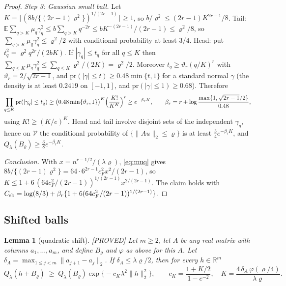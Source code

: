 \documentclass[11pt]{article}
\newtheorem{lemma}{Lemma}
\theoremstyle{definition}
\theoremstyle{remark}
\newcommand{\R}{\mathbb{R}}
\newcommand{\E}{\mathbb{E}}
\newcommand{\pr}{\mathrm{pr}}
\newcommand{\Ql}{Q_\lambda}
\newcommand{\proved}{\textup{[PROVED]}}
\begin{document}
\begin{proof}
\emph{Step 3: Gaussian small ball.} Let $K=\lceil(8b/\{(2r-1)\varrho^2\})^{1/(2r-1)}\rceil\ge1$, so $b/\varrho^2\le(2r-1)K^{2r-1}/8$. Tail: $\E\sum_{q>K}\mu_q\gamma_q^2\le b\sum_{q>K}q^{-2r}\le bK^{-(2r-1)}/(2r-1)\le\varrho^2/8$, so $\sum_{q>K}\mu_q\gamma_q^2\le\varrho^2/2$ with conditional probability at least $3/4$. Head: put $t_q^2=\varrho^2q^{2r}/(2bK)$. If $|\gamma_q|\le t_q$ for all $q\le K$ then $\sum_{q\le K}\mu_q\gamma_q^2\le\sum_{q\le K}\varrho^2/(2K)=\varrho^2/2$. Moreover $t_q\ge\vartheta_r(q/K)^r$ with $\vartheta_r=2/\sqrt{2r-1}$, and $\pr(|\gamma|\le t)\ge0.48\min\{t,1\}$ for a standard normal $\gamma$ (the density is at least $0.2419$ on $[-1,1]$, and $\pr(|\gamma|\le1)\ge0.68$). Therefore
\[
\prod_{q\le K}\pr(|\gamma_q|\le t_q)\ge\bigl(0.48\min\{\vartheta_r,1\}\bigr)^K\Bigl(\frac{K!}{K^K}\Bigr)^r\ge e^{-\beta_rK},\qquad \beta_r=r+\log\frac{\max\{1,\sqrt{2r-1}/2\}}{0.48},
\]
using $K!\ge(K/e)^K$. Head and tail involve disjoint sets of the independent $\gamma_q$, hence on $\mathcal V$ the conditional probability of $\{\|Au\|_2\le\varrho\}$ is at least $\tfrac34e^{-\beta_rK}$, and $\Ql(B_\varrho)\ge\tfrac38e^{-\beta_rK}$.

\emph{Conclusion.} With $x=n^{r-1/2}/(\lambda\varrho)$, \eqref{eq:muq} gives $8b/\{(2r-1)\varrho^2\}=64\cdot6^{2r-1}c_F^2x^2/(2r-1)$, so $K\le1+6\,(64c_F^2/(2r-1))^{1/(2r-1)}x^{2/(2r-1)}$. The claim holds with $C_{\rm sb}=\log(8/3)+\beta_r\{1+6(64c_F^2/(2r-1))^{1/(2r-1)}\}$.
\end{proof}

\subsection{Shifted balls}

\begin{lemma}[quadratic shift]\label{lem:qshift}\proved{}
Let $m\ge2$, let $A$ be any real matrix with columns $a_1,\dots,a_m$, and define $B_\varrho$ and $\varphi$ as above for this $A$. Let $\delta_A=\max_{1\le j<m}\|a_{j+1}-a_j\|_2$. If $\delta_A\le\lambda\varrho/2$, then for every $h\in\R^m$
\[
\Ql(h+B_\varrho)\;\ge\;\Ql(B_\varrho)\exp\bigl\{-c_K\lambda^2\|h\|_2^2\bigr\},\qquad c_K=\frac{1+K/2}{1-e^{-2}},\quad K=\frac{4\,\delta_A\,\varphi(\varrho/4)}{\lambda\varrho}.
\]
\end{lemma}
\end{document}
